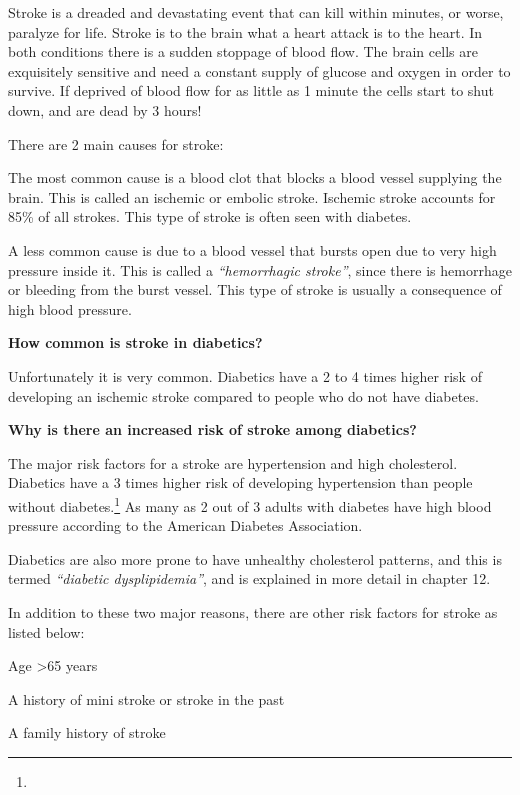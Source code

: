 {Stroke is a dreaded and devastating event that can kill within minutes, or worse, paralyze for life. Stroke is to the brain what a heart attack is to the heart. In both conditions there is a sudden stoppage of blood flow. The brain cells are exquisitely sensitive and need a constant supply of glucose and oxygen in order to survive. If deprived of blood flow for as little as 1 minute the cells start to shut down, and are dead by 3 hours!

There are 2 main causes for stroke:

\item The most common cause is a blood clot that blocks a blood vessel supplying the brain. This is called an ischemic or embolic stroke. Ischemic stroke accounts for 85\% of all strokes. This type of stroke is often seen with diabetes.

 \item A less common cause is due to a blood vessel that bursts open due to very high pressure inside it. This is called a \textit{“hemorrhagic stroke”}, since there is hemorrhage or bleeding from the burst vessel. This type of stroke is usually a consequence of high blood pressure.

\textbf{How common is stroke in diabetics?}

Unfortunately it is very common. Diabetics have a 2 to 4 times higher risk of developing an ischemic stroke compared to people who do not have diabetes.

\textbf{Why is there an increased risk of stroke among diabetics?}

The major risk factors for a stroke are hypertension and high cholesterol. Diabetics have a 3 times higher risk of developing hypertension than people without diabetes.\footnote{} As many as 2 out of 3 adults with diabetes have high blood pressure according to the American Diabetes Association.

Diabetics are also more prone to have unhealthy cholesterol patterns, and this is termed \textit{“diabetic dysplipidemia”}, and is explained in more detail in chapter 12.

In addition to these two major reasons, there are other risk factors for stroke as listed below:

\item Age \textgreater  65 years

 \item A history of mini stroke or stroke in the past

 \item A family history of stroke

}
